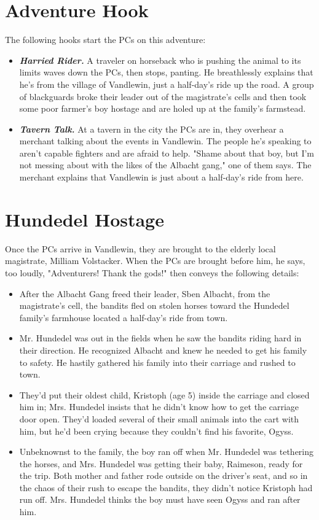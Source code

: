 \documentclass[10pt,a4paper,twoside,bg=print,twocolumn,openany,nodeprecatedcode]{dndbook}
\begin{document}
\section{Adventure Hook}
The following hooks start the PCs on this adventure:


\begin{itemize}
\item \textbf{\textit{Harried Rider.}} A traveler on horseback who is pushing the animal to its limits waves down the PCs, then stops, panting. He breathlessly explains that he's from the village of Vandlewin, just a half-day's ride up the road. A group of blackguards broke their leader out of the magistrate's cells and then took some poor farmer's boy hostage and are holed up at the family's farmstead.
\item \textbf{\textit{Tavern Talk.}} At a tavern in the city the PCs are in, they overhear a merchant talking about the events in Vandlewin. The people he's speaking to aren't capable fighters and are afraid to help. "Shame about that boy, but I'm not messing about with the likes of the Albacht gang," one of them says. The merchant explains that Vandlewin is just about a half-day's ride from here.
\end{itemize}

\section{Hundedel Hostage}
Once the PCs arrive in Vandlewin, they are brought to the elderly local magistrate, Milliam Volstacker. When the PCs are brought before him, he says, too loudly, "Adventurers! Thank the gods!" then conveys the following details:


\begin{itemize}
\item After the Albacht Gang freed their leader, Sben Albacht, from the magistrate's cell, the bandits fled on stolen horses toward the Hundedel family's farmhouse located a half-day's ride from town.
\item Mr. Hundedel was out in the fields when he saw the bandits riding hard in their direction. He recognized Albacht and knew he needed to get his family to safety. He hastily gathered his family into their carriage and rushed to town.
\item They'd put their oldest child, Kristoph (age 5) inside the carriage and closed him in; Mrs. Hundedel insists that he didn't know how to get the carriage door open. They'd loaded several of their small animals into the cart with him, but he'd been crying because they couldn't find his favorite, Ogyss.
\item Unbeknownst to the family, the boy ran off when Mr. Hundedel was tethering the horses, and Mrs. Hundedel was getting their baby, Raimeson, ready for the trip. Both mother and father rode outside on the driver's seat, and so in the chaos of their rush to escape the bandits, they didn't notice Kristoph had run off. Mrs. Hundedel thinks the boy must have seen Ogyss and ran after him.
\end{itemize}
\end{document}
